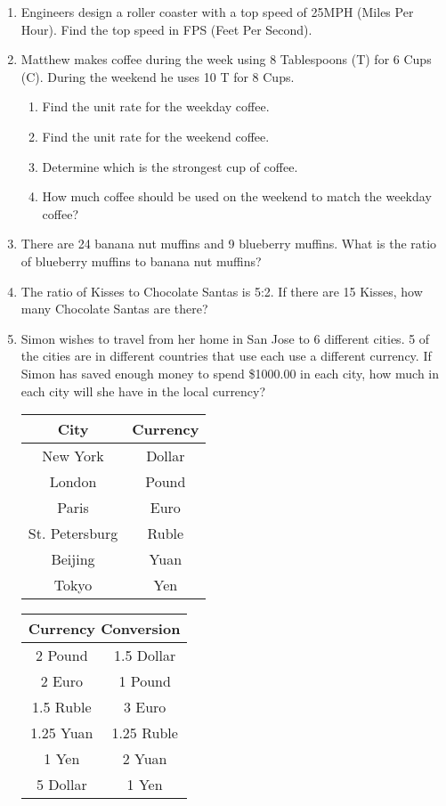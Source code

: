 \documentclass[12pt]{article}
\begin{document}
\large

\begin{enumerate}
\item Engineers design a roller coaster with a top speed of 25MPH (Miles Per Hour).  Find the top speed in FPS (Feet Per Second).


\item Matthew makes coffee during the week using 8 Tablespoons (T) for 6 Cups (C).  During the weekend he uses 10 T for 8 Cups.
	\begin{enumerate}
		\item Find the unit rate for the weekday coffee.
		\item Find the unit rate for the weekend coffee.
		\item Determine which is the strongest cup of coffee.
		\item How much coffee should be used on the weekend to match the weekday coffee?
	\end{enumerate}

\item There are 24 banana nut muffins and 9 blueberry muffins.  What is the ratio of blueberry muffins to banana nut muffins?

\item The ratio of Kisses to Chocolate Santas is 5:2.  If there are 15 Kisses, how many Chocolate Santas are there?

\item Simon wishes to travel from her home in San Jose to 6 different cities.  5 of the cities are in different countries that use each use a different currency.  If Simon has saved enough money to spend \$1000.00 in each city, how much in each city will she have in the local currency?

	\begin{tabular}{ | c | c | }
	\hline
	\bf{City} & \bf{Currency} \\ \hline \hline
	New York & Dollar \\ \hline
	London & Pound \\ \hline
	Paris & Euro \\ \hline
	St. Petersburg & Ruble \\ \hline
	Beijing & Yuan \\ \hline
	Tokyo & Yen \\ \hline
	\hline
	\end{tabular}

	\begin{tabular}{ | c | c | }
	\hline
	\multicolumn{2}{|c|}{\bf{Currency Conversion}} \\ \hline \hline
	2 Pound & 1.5 Dollar \\ \hline
	2 Euro & 1 Pound \\ \hline
	1.5 Ruble & 3 Euro \\ \hline
	1.25 Yuan & 1.25 Ruble \\ \hline
	1 Yen & 2 Yuan \\ \hline
	5 Dollar & 1 Yen \\ \hline
	\hline
	\end{tabular}

\end{enumerate}
\end{document}
